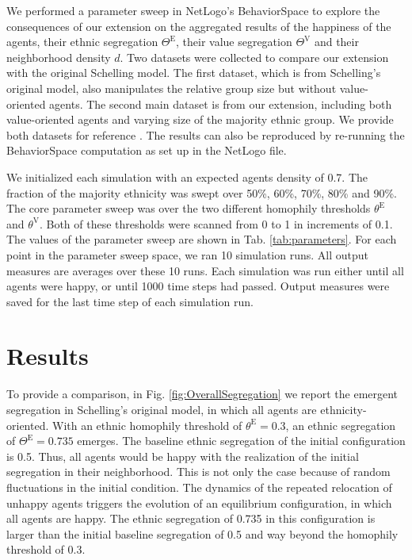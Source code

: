 \documentclass{ws-acs}
\begin{document}
{We performed a parameter sweep in NetLogo's BehaviorSpace to explore the consequences of our extension on the aggregated results of the happiness of the agents, their ethnic segregation $\Theta^\text{E}$, their value segregation $\Theta^\text{V}$ and their neighborhood density $d$. Two datasets were collected to compare our extension with the original Schelling model. The first dataset, which is from Schelling's original model, also manipulates the relative group size but without value-oriented agents. The second main dataset is from our extension, including both value-oriented agents and varying size of the majority ethnic group. We provide both datasets for reference \cite{PaolilloLorenz2018ValueSegregation}. The results can also be reproduced by re-running the BehaviorSpace computation as set up in the NetLogo file. 

We initialized each simulation with an expected agents density of 0.7. The fraction of the majority ethnicity was swept over 50\%, 60\%, 70\%, 80\% and 90\%. The core parameter sweep was over the two different homophily thresholds $\theta^\text{E}$ and $\theta^\text{V}$. Both of these thresholds were scanned from 0 to 1 in increments of 0.1. The values of the parameter sweep are shown in Tab. \ref{tab:parameters}. For each point in the parameter sweep space, we ran 10 simulation runs. All output measures are averages over these 10 runs. Each simulation was run either until all agents were happy, or until 1000 time steps had passed. Output measures were saved for the last time step of each simulation run. 



\section{Results}

To provide a comparison, in Fig. \ref{fig:OverallSegregation} we report the emergent segregation in Schelling's original model, in which all agents are ethnicity-oriented. With an ethnic homophily threshold of $\theta^\text{E}=0.3$, an ethnic segregation of $\Theta^\text{E} =0.735$ emerges. The baseline ethnic segregation of the initial configuration is 0.5. Thus, all agents would be happy with the realization of the initial segregation in their neighborhood. This is not only the case because of random fluctuations in the initial condition. The dynamics of the repeated relocation of unhappy agents triggers the evolution of an equilibrium configuration, in which all agents are happy. The ethnic segregation of 0.735 in this configuration is larger than the initial baseline segregation of 0.5 and way beyond the homophily threshold of 0.3. 

}
\end{document}

